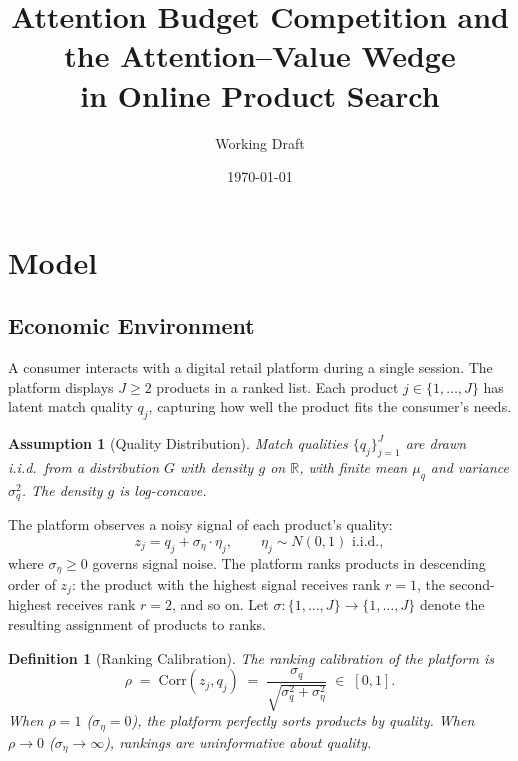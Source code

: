 \documentclass[12pt]{article}
\title{Attention Budget Competition and the Attention--Value Wedge\\in Online Product Search}
\author{Working Draft}
\date{\today}
\newtheorem{assumption}{Assumption}
\newtheorem{definition}{Definition}
\begin{document}
\maketitle

\section{Model}\label{sec:model}

\subsection{Economic Environment}\label{sec:environment}

A consumer interacts with a digital retail platform during a single session. The platform displays $J \geq 2$ products in a ranked list. Each product $j \in \{1, \dots, J\}$ has latent match quality $q_j$, capturing how well the product fits the consumer's needs.

\begin{assumption}[Quality Distribution]\label{a:quality}
Match qualities $\{q_j\}_{j=1}^{J}$ are drawn i.i.d.\ from a distribution $G$ with density $g$ on $\mathbb{R}$, with finite mean $\mu_q$ and variance $\sigma_q^2$. The density $g$ is log-concave.
\end{assumption}

The platform observes a noisy signal of each product's quality:
\begin{equation}\label{eq:signal}
    z_j = q_j + \sigma_\eta \cdot \eta_j, \qquad \eta_j \sim N(0,1) \text{ i.i.d.},
\end{equation}
where $\sigma_\eta \geq 0$ governs signal noise. The platform ranks products in descending order of $z_j$: the product with the highest signal receives rank $r = 1$, the second-highest receives rank $r = 2$, and so on. Let $\sigma: \{1,\dots,J\} \to \{1,\dots,J\}$ denote the resulting assignment of products to ranks.

\begin{definition}[Ranking Calibration]\label{def:calibration}
The \emph{ranking calibration} of the platform is
\begin{equation}\label{eq:calibration}
    \rho \;=\; \mathrm{Corr}(z_j, q_j) \;=\; \frac{\sigma_q}{\sqrt{\sigma_q^2 + \sigma_\eta^2}} \;\in\; [0, 1].
\end{equation}
When $\rho = 1$ ($\sigma_\eta = 0$), the platform perfectly sorts products by quality. When $\rho \to 0$ ($\sigma_\eta \to \infty$), rankings are uninformative about quality.
\end{definition}
\end{document}
